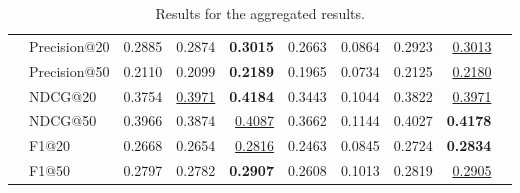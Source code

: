 \begin{table*}[]
{\begin{tabular}{@{}l|l|rrrrrr|rl@{}}
                        & Precision@20 & 0.2885       & 0.2874       & \textbf{0.3015} & 0.2663 & 0.0864          & 0.2923 & {\ul {0.3013}}    &  \\
                        & Precision@50 & 0.2110       & 0.2099       & \textbf{0.2189} & 0.1965 & 0.0734          & 0.2125 & {\ul {0.2180}}    &  \\
                        & NDCG@20      & 0.3754       & {\ul{ 0.3971}} & \textbf{0.4184} & 0.3443 & 0.1044          & 0.3822 & {\ul {0.3971}}    &  \\
                        & NDCG@50      & 0.3966       & 0.3874       & {\ul {0.4087}}    & 0.3662 & 0.1144          & 0.4027 & \textbf{0.4178} &  \\
                        & F1@20        & 0.2668       & 0.2654       & {\ul{0.2816}}    & 0.2463 & 0.0845          & 0.2724 & \textbf{0.2834} &  \\
                        & F1@50        & 0.2797       & 0.2782       & \textbf{0.2907} & 0.2608 & 0.1013          & 0.2819 & {\ul{0.2905}}    &  \\ \bottomrule
\end{tabular}%
}
\caption{Results for the aggregated results.}
\label{tab:aggregatedresults}
\end{table*}

